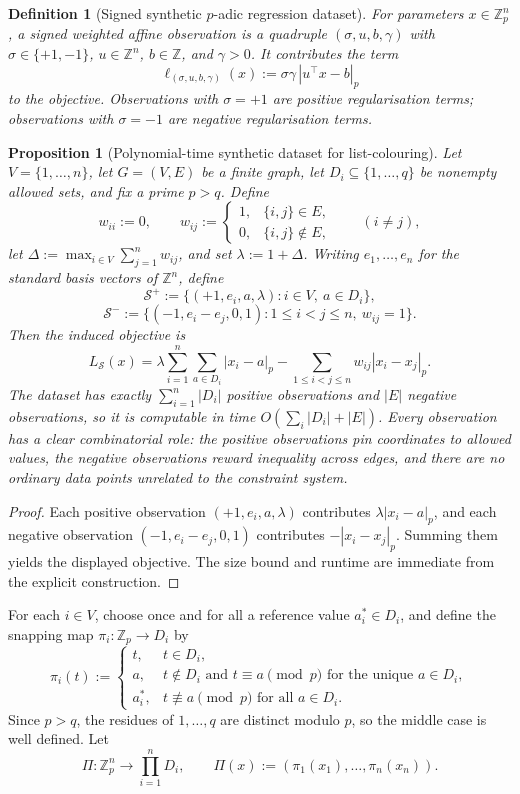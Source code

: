 \documentclass[11pt]{article}
\newtheorem{proposition}[theorem]{Proposition}
\newtheorem{definition}{Definition}
\begin{document}
\begin{definition}[Signed synthetic $p$-adic regression dataset]
\label{def:signed-dataset}
For parameters \(x\in \mathbb Z_p^n\), a signed weighted affine observation is a quadruple \((\sigma,u,b,\gamma)\) with \(\sigma\in\{+1,-1\}\), \(u\in\mathbb Z^n\), \(b\in\mathbb Z\), and \(\gamma>0\). It contributes the term
\[
\ell_{(\sigma,u,b,\gamma)}(x):=\sigma\gamma\,|u^\top x-b|_p
\]
to the objective. Observations with \(\sigma=+1\) are \emph{positive regularisation} terms; observations with \(\sigma=-1\) are \emph{negative regularisation} terms.
\end{definition}

\begin{proposition}[Polynomial-time synthetic dataset for list-colouring]
\label{prop:list-dataset}
Let \(V=\{1,\dots,n\}\), let \(G=(V,E)\) be a finite graph, let \(D_i\subseteq \{1,\dots,q\}\) be nonempty allowed sets, and fix a prime \(p>q\). Define
\[
w_{ii}:=0,
\qquad
w_{ij}:=
\begin{cases}
1, & \{i,j\}\in E,\\
0, & \{i,j\}\notin E,
\end{cases}
\qquad (i\neq j),
\]
let \(\Delta:=\max_{i\in V}\sum_{j=1}^n w_{ij}\), and set \(\lambda:=1+\Delta\). Writing \(e_1,\dots,e_n\) for the standard basis vectors of \(\mathbb Z^n\), define
\[
\mathcal S^+ := \{(+1,e_i,a,\lambda): i\in V,\ a\in D_i\},
\]
\[
\mathcal S^- := \{(-1,e_i-e_j,0,1): 1\le i<j\le n,\ w_{ij}=1\}.
\]
Then the induced objective is
\[
L_{\mathcal S}(x)
=
\lambda\sum_{i=1}^n \sum_{a\in D_i}|x_i-a|_p
-\sum_{1\le i<j\le n} w_{ij}|x_i-x_j|_p.
\]
The dataset has exactly \(\sum_{i=1}^n |D_i|\) positive observations and \(|E|\) negative observations, so it is computable in time \(O(\sum_i |D_i|+|E|)\). Every observation has a clear combinatorial role: the positive observations pin coordinates to allowed values, the negative observations reward inequality across edges, and there are no ordinary data points unrelated to the constraint system.
\end{proposition}

\begin{proof}
Each positive observation \((+1,e_i,a,\lambda)\) contributes \(\lambda|x_i-a|_p\), and each negative observation \((-1,e_i-e_j,0,1)\) contributes \(-|x_i-x_j|_p\). Summing them yields the displayed objective. The size bound and runtime are immediate from the explicit construction.
\end{proof}

For each \(i\in V\), choose once and for all a reference value \(a_i^\ast\in D_i\), and define the snapping map \(\pi_i:\mathbb Z_p\to D_i\) by
\[
\pi_i(t):=
\begin{cases}
t, & t\in D_i,\\
a, & t\notin D_i \text{ and } t\equiv a \pmod p \text{ for the unique } a\in D_i,\\
a_i^\ast, & t\not\equiv a \pmod p \text{ for all } a\in D_i.
\end{cases}
\]
Since \(p>q\), the residues of \(1,\dots,q\) are distinct modulo \(p\), so the middle case is well defined. Let
\[
\Pi:\mathbb Z_p^n\to \prod_{i=1}^n D_i,
\qquad
\Pi(x):=(\pi_1(x_1),\dots,\pi_n(x_n)).
\]
\end{document}
